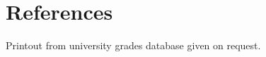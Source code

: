 \documentclass[11pt,a4paper,sans]{moderncv}        %
\begin{document}



\section{References}
Printout from university grades database given on request.


%
\end{document}

